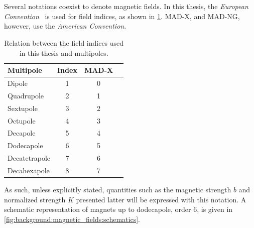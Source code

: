 \section{}

\subsection{}

Several notations coexist to denote magnetic fields. In this thesis, the
\textit{European Convention}~\cite{dilly_corrections_2022} is used for field indices, as shown
in \cref{tab:magnetic_fields:relation_indices}. MAD-X, and MAD-NG, however, use the
\textit{American Convention}. 

\begin{table}[H]
    \centering
    \begin{tabular}{lccc}
    \toprule
        Multipole     &     Index         &      MAD-X      \\
    \midrule                              
        Dipole        &     1             &     0           \\
        Quadrupole    &     2             &     1           \\
        Sextupole     &     3             &     2           \\
        Octupole      &     4             &     3           \\
        Decapole      &     5             &     4           \\
        Dodecapole    &     6             &     5           \\
        Decatetrapole &     7             &     6           \\
        Decahexapole  &     8             &     7           \\
    \bottomrule
    \end{tabular}
    \caption{Relation between the field indices used in this thesis and multipoles.}
    \label{tab:magnetic_fields:relation_indices}
  \end{table}

As such, unless explicitly stated, quantities such as the magnetic strength $b$ and normalized
strength $K$ presented latter will be expressed with this notation. 
A schematic representation of magnets up to dodecapole, order 6, is given in
\cref{fig:background:magnetic_fields:schematics}.

